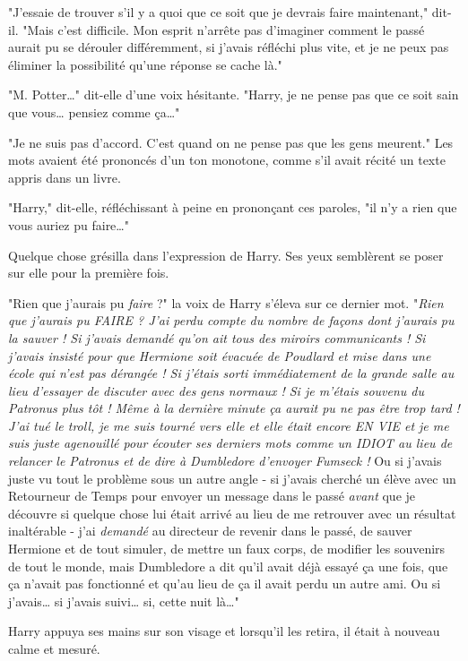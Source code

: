 "J'essaie de trouver s'il y a quoi que ce soit que je devrais faire maintenant," dit-il. "Mais c'est difficile. Mon esprit n'arrête pas d'imaginer comment le passé aurait pu se dérouler différemment, si j'avais réfléchi plus vite, et je ne peux pas éliminer la possibilité qu'une réponse se cache là."

"M. Potter…" dit-elle d'une voix hésitante. "Harry, je ne pense pas que ce soit sain que vous… pensiez comme ça…"

"Je ne suis pas d'accord. C'est quand on ne pense pas que les gens meurent." Les mots avaient été prononcés d'un ton monotone, comme s'il avait récité un texte appris dans un livre.

"Harry," dit-elle, réfléchissant à peine en prononçant ces paroles, "il n'y a rien que vous auriez pu faire…"

Quelque chose grésilla dans l'expression de Harry. Ses yeux semblèrent se poser sur elle pour la première fois.

"Rien que j'aurais pu \emph{faire}  ?" la voix de Harry s'éleva sur ce dernier mot. "\emph{Rien que j'aurais pu FAIRE ? J'ai perdu compte du nombre de façons dont j'aurais pu la sauver ! Si j'avais demandé qu'on ait tous des miroirs communicants ! Si j'avais insisté pour que Hermione soit évacuée de Poudlard et mise dans une école qui n'est pas dérangée ! Si j'étais sorti immédiatement de la grande salle au lieu d'essayer de discuter avec des gens normaux ! Si je m'étais souvenu du Patronus plus tôt ! Même à la dernière minute ça aurait pu ne pas être trop tard ! J'ai tué le troll, je me suis tourné vers elle et elle était encore EN VIE et je me suis juste agenouillé pour écouter ses derniers mots comme un IDIOT au lieu de relancer le Patronus et de dire à Dumbledore d'envoyer Fumseck !}  Ou si j'avais juste vu tout le problème sous un autre angle - si j'avais cherché un élève avec un Retourneur de Temps pour envoyer un message dans le passé \emph{avant}  que je découvre si quelque chose lui était arrivé au lieu de me retrouver avec un résultat inaltérable - j'ai \emph{demandé}  au directeur de revenir dans le passé, de sauver Hermione et de tout simuler, de mettre un faux corps, de modifier les souvenirs de tout le monde, mais Dumbledore a dit qu'il avait déjà essayé ça une fois, que ça n'avait pas fonctionné et qu'au lieu de ça il avait perdu un autre ami. Ou si j'avais… si j'avais suivi… si, cette nuit là…"

Harry appuya ses mains sur son visage et lorsqu'il les retira, il était à nouveau calme et mesuré.

